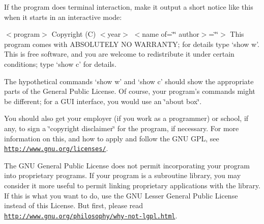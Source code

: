 If the program does terminal interaction, make it output a short notice like this when it starts in an interactive mode\-:

$<$program$>$ Copyright (C) $<$year$>$ $<$name of=\char`\"{}\char`\"{} author$>$=\char`\"{}\char`\"{}$>$ This program comes with A\-B\-S\-O\-L\-U\-T\-E\-L\-Y N\-O W\-A\-R\-R\-A\-N\-T\-Y; for details type `show w'. This is free software, and you are welcome to redistribute it under certain conditions; type `show c' for details.

The hypothetical commands `show w' and `show c' should show the appropriate parts of the General Public License. Of course, your program's commands might be different; for a G\-U\-I interface, you would use an \char`\"{}about box\char`\"{}.

You should also get your employer (if you work as a programmer) or school, if any, to sign a \char`\"{}copyright disclaimer\char`\"{} for the program, if necessary. For more information on this, and how to apply and follow the G\-N\-U G\-P\-L, see \href{http://www.gnu.org/licenses/}{\tt http\-://www.\-gnu.\-org/licenses/}.

The G\-N\-U General Public License does not permit incorporating your program into proprietary programs. If your program is a subroutine library, you may consider it more useful to permit linking proprietary applications with the library. If this is what you want to do, use the G\-N\-U Lesser General Public License instead of this License. But first, please read \href{http://www.gnu.org/philosophy/why-not-lgpl.html}{\tt http\-://www.\-gnu.\-org/philosophy/why-\/not-\/lgpl.\-html}. 
